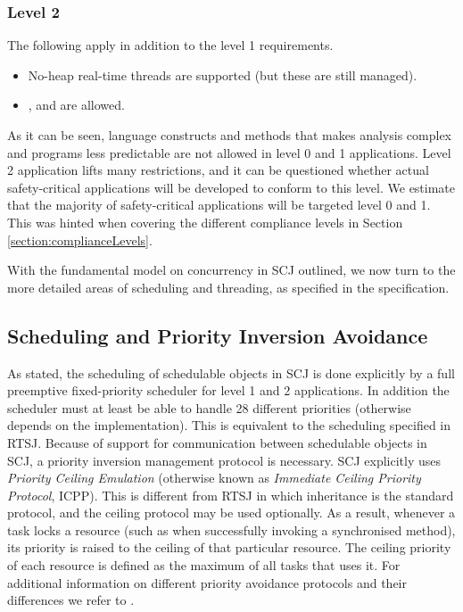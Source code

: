 \subsubsection{Level 2}
The following apply in addition to the level 1 requirements.
\begin{itemize}
	\item No-heap real-time threads are supported (but these are still managed).
	\item {},  and  are allowed.
\end{itemize}

As it can be seen, language constructs and methods that makes analysis complex and programs less predictable are not allowed in level 0 and 1 applications. Level 2 application lifts many restrictions, and it can be questioned whether actual safety-critical applications will be developed to conform to this level. We estimate that the majority of safety-critical applications will be targeted level 0 and 1. This was hinted when covering the different compliance levels in Section \ref{section:complianceLevels}.

With the fundamental model on concurrency in SCJ outlined, we now turn to the more detailed areas of scheduling and threading, as specified in the specification.

\subsection{Scheduling and Priority Inversion Avoidance} %
\label{sub:schedulingobjects}
As stated, the scheduling of schedulable objects in SCJ is done explicitly by a full preemptive fixed-priority scheduler for level 1 and 2 applications. In addition the scheduler must at least be able to handle 28 different priorities (otherwise depends on the implementation). This is equivalent to the scheduling specified in RTSJ. Because of support for communication between schedulable objects in SCJ, a priority inversion management protocol is necessary. SCJ explicitly uses \textit{Priority Ceiling Emulation} (otherwise known as \textit{Immediate Ceiling Priority Protocol}, ICPP). This is different from RTSJ in which inheritance is the standard protocol, and the ceiling protocol may be used optionally. As a result, whenever a task locks a resource (such as when successfully invoking a synchronised method), its priority is raised to the ceiling of that particular resource. The ceiling priority of each resource is defined as the maximum of all tasks that uses it. For additional information on different priority avoidance protocols and their differences we refer to \cite{alan2001real}.

